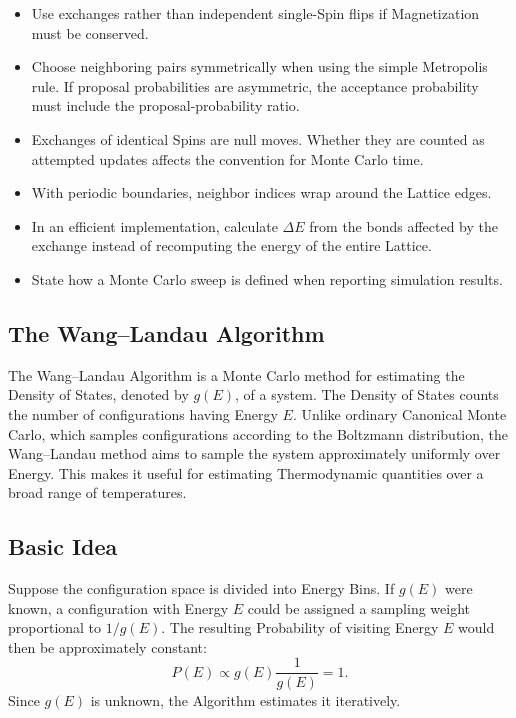\documentclass[a4paper, 10pt, onepage]{elegantbook}
\begin{document}
{\begin{itemize}
  \item Use exchanges rather than independent single-Spin flips if
        Magnetization must be conserved.
  \item Choose neighboring pairs symmetrically when using the simple
        Metropolis rule. If proposal probabilities are asymmetric, the
        acceptance probability must include the proposal-probability
        ratio.
  \item Exchanges of identical Spins are null moves. Whether they are
        counted as attempted updates affects the convention for Monte
        Carlo time.
  \item With periodic boundaries, neighbor indices wrap around the
        Lattice edges.
  \item In an efficient implementation, calculate \(\Delta E\) from
        the bonds affected by the exchange instead of recomputing the
        energy of the entire Lattice.
  \item State how a Monte Carlo sweep is defined when reporting
        simulation results.
\end{itemize}

\subsection{The Wang--Landau Algorithm}

The Wang--Landau Algorithm is a Monte Carlo method for estimating the
Density of States, denoted by \(g(E)\), of a system. The Density of
States counts the number of configurations having Energy \(E\). Unlike
ordinary Canonical Monte Carlo, which samples configurations according
to the Boltzmann distribution, the Wang--Landau method aims to sample
the system approximately uniformly over Energy. This makes it useful
for estimating Thermodynamic quantities over a broad range of
temperatures.

\subsection{Basic Idea}

Suppose the configuration space is divided into Energy Bins. If
\(g(E)\) were known, a configuration with Energy \(E\) could be assigned
a sampling weight proportional to \(1/g(E)\). The resulting Probability
of visiting Energy \(E\) would then be approximately constant:
\[
  P(E) \propto g(E)\frac{1}{g(E)} = 1.
\]
Since \(g(E)\) is unknown, the Algorithm estimates it iteratively.

}
\end{document}
